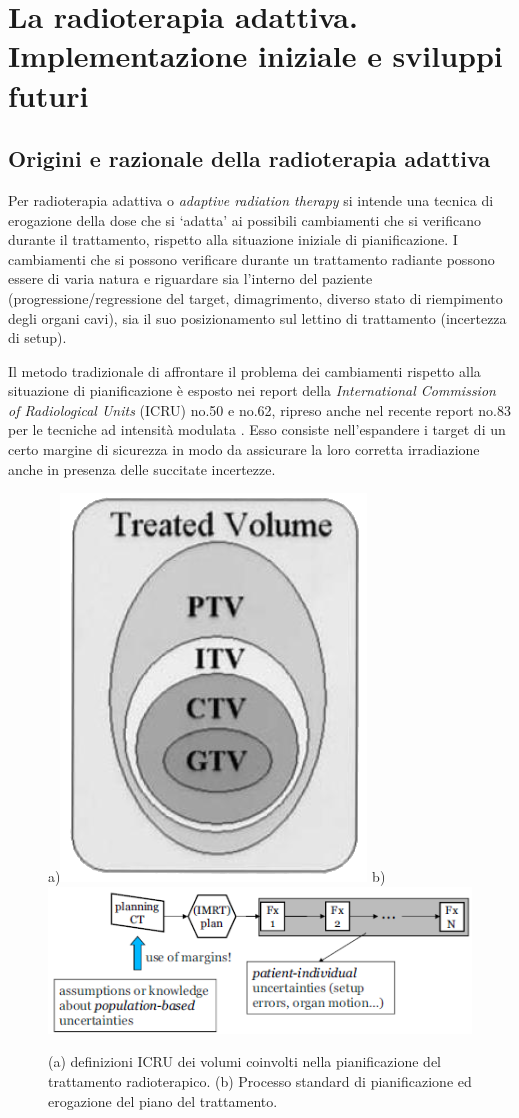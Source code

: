 \chapter{La radioterapia adattiva. Implementazione iniziale e sviluppi futuri}
\minitoc
\textsf{}

\section{Origini e razionale della radioterapia adattiva}
Per radioterapia adattiva o \textit{adaptive radiation therapy} si intende una tecnica di erogazione della dose che si `adatta' ai possibili cambiamenti che si verificano durante il trattamento, rispetto alla situazione iniziale di pianificazione. I cambiamenti che si possono verificare durante un trattamento radiante possono essere di varia natura e riguardare sia l'interno del paziente (progressione/regressione del target, dimagrimento, diverso stato di riempimento degli organi cavi), sia il suo  posizionamento sul lettino di trattamento (incertezza di setup). 

Il metodo tradizionale di affrontare il problema dei cambiamenti rispetto alla situazione di pianificazione è esposto nei report della \textit{International Commission of Radiological Units} (ICRU) no.50 e no.62, ripreso anche nel recente report no.83 per le tecniche ad intensità modulata \cite{ICRU2010}. Esso consiste nell'espandere i target di un certo margine di sicurezza in modo da assicurare la loro corretta irradiazione anche in presenza delle succitate incertezze.
\begin{figure}
\centering
a)\includegraphics[width=.25\textwidth]{./cap3/ptv.png}
b) \includegraphics[width=.64\textwidth]{./cap3/adapt0.png}
\caption{(a) definizioni ICRU dei volumi coinvolti nella pianificazione del trattamento radioterapico. (b) Processo standard di pianificazione ed erogazione del piano del trattamento.}
\label{fig:adapt0}
\end{figure}

